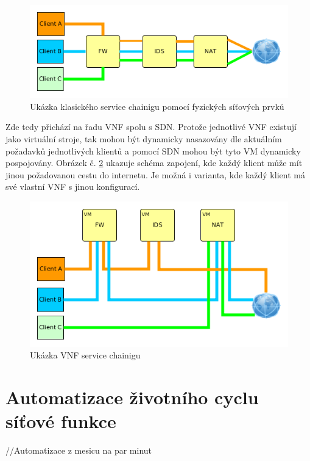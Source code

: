 \begin{figure}[h]
\begin{centering}
\includegraphics[scale=0.55]{images/service_chaining}
\par\end{centering}
\caption{Ukázka klasického service chainigu pomocí fyzických síťových prvků\label{fig:service_chaining}}
\end{figure}

Zde tedy přichází na řadu VNF spolu s SDN. Protože jednotlivé VNF existují jako virtuální stroje, tak mohou být dynamicky nasazovány dle aktuálním požadavků jednotlivých klientů a pomocí SDN mohou být tyto VM dynamicky pospojovány. Obrázek č. \ref{fig:service_chaining_new} ukazuje schéma zapojení, kde každý klient může mít jinou požadovanou cestu do internetu. Je možná i varianta, kde každý klient má své vlastní VNF s jinou konfigurací.

\begin{figure}[h]
\begin{centering}
\includegraphics[scale=0.55]{images/service_chaining_new}
\par\end{centering}
\caption{Ukázka VNF service chainigu\label{fig:service_chaining_new}}
\end{figure}

\section{Automatizace životního cyclu síťové funkce}

//Automatizace z mesicu na par minut